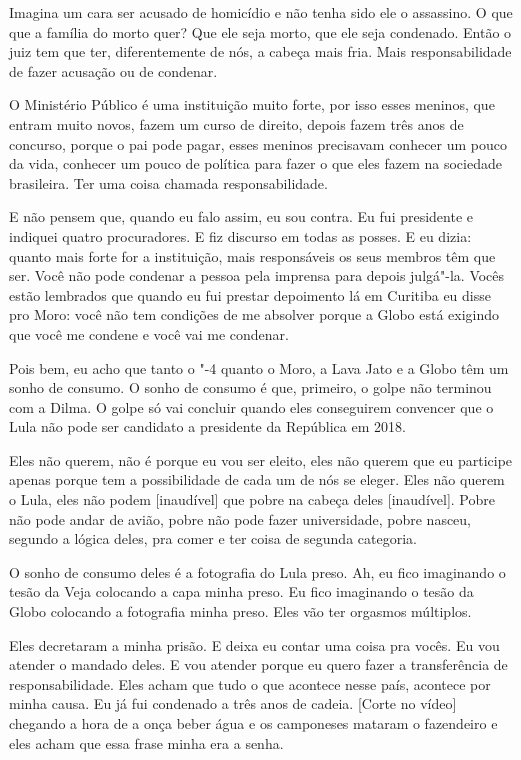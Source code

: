 Imagina um cara ser acusado de homicídio e não tenha sido ele o
assassino. O que que a família do morto quer? Que ele seja morto, que
ele seja condenado. Então o juiz tem que ter, diferentemente de nós, a
cabeça mais fria. Mais responsabilidade de fazer acusação ou de
condenar.

O Ministério Público é uma instituição muito forte, por isso esses
meninos, que entram muito novos, fazem um curso de direito, depois fazem
três anos de concurso, porque o pai pode pagar, esses meninos precisavam
conhecer um pouco da vida, conhecer um pouco de política para fazer o
que eles fazem na sociedade brasileira. Ter uma coisa chamada
responsabilidade.

E não pensem que, quando eu falo assim, eu sou contra. Eu fui
presidente e indiquei quatro procuradores. E fiz discurso em todas as
posses. E eu dizia: quanto mais forte for a instituição, mais
responsáveis os seus membros têm que ser. Você não pode condenar a
pessoa pela imprensa para depois julgá"-la. Vocês estão lembrados
que quando eu fui prestar depoimento lá em Curitiba eu disse pro Moro:
você não tem condições de me absolver porque a Globo está exigindo que
você me condene e você vai me condenar.

Pois bem, eu acho que tanto o "-4 quanto o Moro, a Lava Jato e a
Globo têm um sonho de consumo. O sonho de consumo é que, primeiro,
o golpe não terminou com a Dilma. O golpe só vai concluir quando eles
conseguirem convencer que o Lula não pode ser candidato a presidente da
República em 2018.

Eles não querem, não é porque eu vou ser eleito, eles não querem
que eu participe apenas porque tem a possibilidade de cada um de nós se
eleger. Eles não querem o Lula, eles não podem [inaudível] que pobre
na cabeça deles [inaudível]. Pobre não pode andar de avião, pobre
não pode fazer universidade, pobre nasceu, segundo a lógica deles, pra
comer e ter coisa de segunda categoria.

O sonho de consumo deles é a fotografia do Lula preso. Ah, eu fico
imaginando o tesão da Veja colocando a capa minha preso. Eu fico
imaginando o tesão da Globo colocando a fotografia minha preso. Eles vão
ter orgasmos múltiplos.

Eles decretaram a minha prisão. E deixa eu contar uma coisa pra
vocês. Eu vou atender o mandado deles. E vou atender porque eu quero
fazer a transferência de responsabilidade. Eles acham que tudo o que
acontece nesse país, acontece por minha causa. Eu já fui condenado a
três anos de cadeia. [Corte no vídeo] chegando a hora de a onça
beber água e os camponeses mataram o fazendeiro e eles acham que essa
frase minha era a senha.

